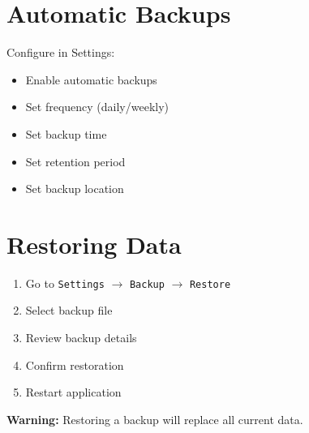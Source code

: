 \documentclass[12pt,a4paper]{report}
\begin{document}
\section{Automatic Backups}

Configure in Settings:
\begin{itemize}[leftmargin=*]
    \item Enable automatic backups
    \item Set frequency (daily/weekly)
    \item Set backup time
    \item Set retention period
    \item Set backup location
\end{itemize}

\section{Restoring Data}

\begin{enumerate}[leftmargin=*]
    \item Go to \texttt{Settings} $\rightarrow$ \texttt{Backup} $\rightarrow$ \texttt{Restore}
    \item Select backup file
    \item Review backup details
    \item Confirm restoration
    \item Restart application
\end{enumerate}

\textbf{Warning:} Restoring a backup will replace all current data.
\end{document}
